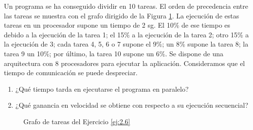 \begin{ejercicio} \label{ej:2.6}
    Un programa se ha conseguido dividir en 10 tareas. El orden de precedencia entre las tareas se
    muestra con el grafo dirigido de la Figura \ref{fig:Grafo_2.6}. La ejecución de estas tareas en un procesador supone un tiempo de 2 sg.
    El 10\% de ese tiempo es debido a la ejecución de la tarea 1; el 15\% a la ejecución de la tarea 2; otro 15\% a la ejecución de 3;
    cada tarea 4, 5, 6 o 7 supone el 9\%; un 8\% supone la tarea 8; la tarea 9 un 10\%; por último, la tarea 10 supone un 6\%.
    Se dispone de una arquitectura con 8 procesadores para ejecutar la aplicación. Consideramos que el tiempo de comunicación se puede despreciar.
    \begin{enumerate}
        \item ¿Qué tiempo tarda en ejecutarse el programa en paralelo?
        \item ¿Qué ganancia en velocidad se obtiene con respecto a su ejecución secuencial?
    \end{enumerate}
    \begin{figure}
        \centering
        \caption{Grafo de tareas del Ejercicio \ref{ej:2.6}}
        \label{fig:Grafo_2.6}
    \end{figure}
\end{ejercicio}

